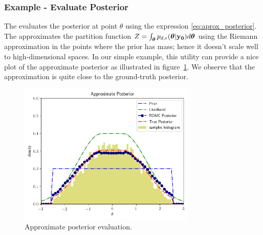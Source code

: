 \subsubsection*{Example - Evaluate Posterior}

The  evaluates the
posterior at point $\theta$ using the expression
\eqref{eq:aprox_posterior}. The 
approximates the partition function
$Z = \int_{\boldsymbol{\theta}} p_{d,\epsilon}(\boldsymbol{\theta}|\mathbf{y_0}) d\boldsymbol{\theta}$ using the
Riemann approximation in the points where the prior has mass; hence it
doesn't scale well to high-dimensional spaces. In our simple example,
this utility can provide a nice plot of the approximate posterior as
illustrated in figure~\ref{fig:approx_posterior}. We observe that the
approximation is quite close to the ground-truth posterior.

\begin{figure}[ht]
    \begin{center}
      \includegraphics[width=0.75\textwidth]{./Thesis/images/chapter3/example_posterior.png}
    \end{center}
  \caption[Approximate posterior evaluation, at the 1D example.]{Approximate posterior evaluation.}
  \label{fig:approx_posterior}
\end{figure}
